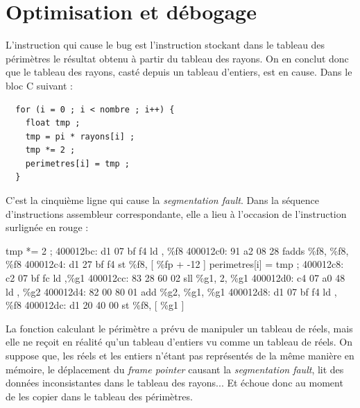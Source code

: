 \documentclass[12pt,a4paper]{article}
\newcommand\tab[1][1cm]{\hspace*{#1}}
\begin{document}
\section{Optimisation et débogage}
L'instruction qui cause le bug est l'instruction stockant dans le tableau des périmètres le résultat obtenu à partir du tableau des rayons. On en conclut donc que le tableau des rayons, casté depuis un tableau d'entiers, est en cause.\newline
Dans le bloc C suivant :
\begin{framed}
 

\begin{verbatim}
  for (i = 0 ; i < nombre ; i++) {
    float tmp ;
    tmp = pi * rayons[i] ;
    tmp *= 2 ;
    perimetres[i] = tmp ;
  }
\end{verbatim}
\end{framed}
C'est la cinquième ligne qui cause la \textit{segmentation fault}.\newline
Dans la séquence d'instructions assembleur correspondante, elle a lieu à l'occasion de l'instruction surlignée en rouge :
  \begin{framed}
   {\selectfont
    tmp *= 2 ;\newline
    400012bc:	d1 07 bf f4 \tab	ld  \tab[ \%fp + -12 ], \%f8 \newline
      400012c0:	91 a2 08 28 \tab	fadds \tab \%f8, \%f8, \%f8  \newline
      400012c4:	d1 27 bf f4 \tab	st  \tab\%f8, [ \%fp + -12 ]\newline
      perimetres[i] = tmp ;\newline
      \color{red}
      400012c8:	c2 07 bf fc \tab	ld \tab [ \%fp + -4 ],\%g1\newline
        \color{black}
        400012cc:	83 28 60 02 \tab	sll \tab \%g1, 2, \%g1\newline
        400012d0:	c4 07 a0 48 \tab	ld  \tab[ \%fp + 0x48 ], \%g2 \newline
          400012d4:	82 00 80 01 \tab	add \tab \%g2, \%g1, \%g1\newline
          400012d8:	d1 07 bf f4 	\tab ld \tab [ \%fp + -12 ], \%f8\newline
            400012dc:	d1 20 40 00 \tab	st \tab \%f8, [ \%g1 ] \newline    
            }
  \end{framed}
  La fonction calculant le périmètre a prévu de manipuler un tableau de réels, mais elle ne reçoit en réalité qu'un tableau d'entiers vu comme un tableau de réels. On suppose que, les réels et les entiers n'étant pas représentés de la même manière en mémoire, le déplacement du \textit{frame pointer} causant la \textit{segmentation fault}, lit des données inconsistantes dans le tableau des rayons... Et échoue donc au moment de les copier dans le tableau des périmètres.
\end{document}
